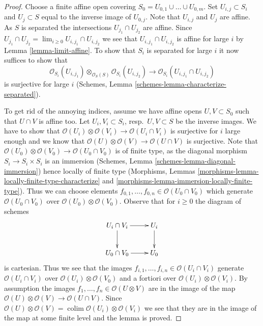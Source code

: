 \documentclass[10pt,a4paper]{amsart}
\theoremstyle{plain}
\theoremstyle{definition}
\theoremstyle{remark}
\numberwithin{equation}{subsection}
\def\lim{\mathop{\mathrm{lim}}\nolimits}
\def\colim{\mathop{\mathrm{colim}}\nolimits}
\begin{document}
\begin{proof}
Choose a finite affine open covering
$S_0 = U_{0, 1} \cup \ldots \cup U_{0, m}$.
Set $U_{i, j} \subset S_i$ and $U_j \subset S$
equal to the inverse image of $U_{0, j}$.
Note that $U_{i, j}$ and $U_j$ are affine. As $S$ is separated
the intersections $U_{j_1} \cap U_{j_2}$ are affine. Since
$U_{j_1} \cap U_{j_2} = \lim_{i \geq 0} U_{i, j_1} \cap U_{i, j_2}$
we see that $U_{i, j_1} \cap U_{i, j_2}$ is affine for large $i$
by Lemma \ref{lemma-limit-affine}. To show that $S_i$ is separated
for large $i$ it now suffices to show that
$$
\mathcal{O}_{S_i}(U_{i, j_1})
\otimes_{\mathcal{O}_S(S)}
\mathcal{O}_{S_i}(U_{i, j_2})
\longrightarrow
\mathcal{O}_{S_i}(U_{i, j_1} \cap U_{i, j_2})
$$
is surjective for large $i$
(Schemes, Lemma \ref{schemes-lemma-characterize-separated}).

\medskip\noindent
To get rid of the annoying indices, assume we have affine opens
$U, V \subset S_0$ such that $U \cap V$ is affine too.
Let $U_i, V_i \subset S_i$, resp.\ $U, V \subset S$ be the inverse images.
We have to show that
$\mathcal{O}(U_i) \otimes \mathcal{O}(V_i) \to
\mathcal{O}(U_i \cap V_i)$
is surjective for $i$ large enough and we know that
$\mathcal{O}(U) \otimes \mathcal{O}(V) \to \mathcal{O}(U \cap V)$
is surjective. Note that
$\mathcal{O}(U_0) \otimes \mathcal{O}(V_0) \to
\mathcal{O}(U_0 \cap V_0)$
is of finite type, as the diagonal morphism $S_i \to S_i \times S_i$
is an immersion (Schemes, Lemma \ref{schemes-lemma-diagonal-immersion})
hence locally of finite type
(Morphisms, Lemmas \ref{morphisms-lemma-locally-finite-type-characterize} and
\ref{morphisms-lemma-immersion-locally-finite-type}).
Thus we can choose elements
$f_{0, 1}, \ldots, f_{0, n} \in \mathcal{O}(U_0 \cap V_0)$
which generate $\mathcal{O}(U_0 \cap V_0)$ over
$\mathcal{O}(U_0) \otimes \mathcal{O}(V_0)$.
Observe that for $i \geq 0$ the diagram of schemes
$$
\xymatrix{
U_i \cap V_i \ar[r] \ar[d] & U_i \ar[d] \\
U_0 \cap V_0 \ar[r] & U_0
}
$$
is cartesian. Thus we see that the images
$f_{i, 1}, \ldots, f_{i, n} \in \mathcal{O}(U_i \cap V_i)$
generate $\mathcal{O}(U_i \cap V_i)$ over
$\mathcal{O}(U_i) \otimes \mathcal{O}(V_0)$
and a fortiori over
$\mathcal{O}(U_i) \otimes \mathcal{O}(V_i)$.
By assumption the images $f_1, \ldots, f_n \in \mathcal{O}(U \otimes V)$
are in the image of the map
$\mathcal{O}(U) \otimes \mathcal{O}(V) \to \mathcal{O}(U \cap V)$.
Since
$\mathcal{O}(U) \otimes \mathcal{O}(V) =
\colim \mathcal{O}(U_i) \otimes \mathcal{O}(V_i)$
we see that they are in the image of the map at some finite level
and the lemma is proved.
\end{proof}
\end{document}
